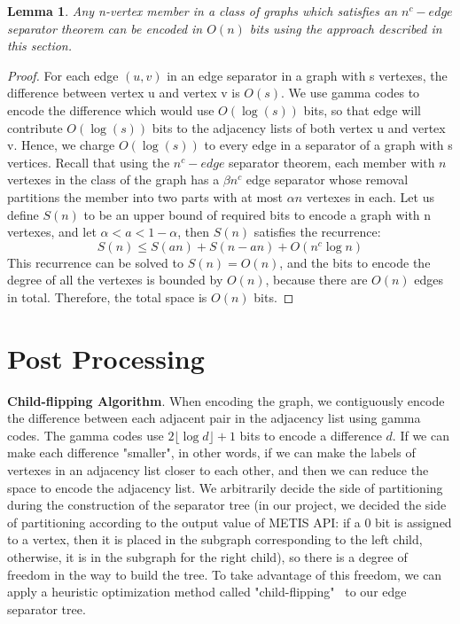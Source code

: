 \documentclass[12pt,glossary]{dalthesis}
\newtheorem{lemma}[theorem]{Lemma}
\begin{document}
\bigskip
\begin{lemma}
Any n-vertex member in a class of graphs which satisfies an $n^{c}-edge$ separator
theorem can be encoded in $O(n)$ bits using the approach described in this section.
\end{lemma}

\bigskip
\begin{proof}
For each edge $(u, v)$ in an edge separator in a graph with s vertexes, the difference
between vertex u and vertex v is $O(s)$. We use gamma codes to encode the difference which would use $O(\log (s))$ bits, so that edge will contribute $O(\log (s))$ bits to the adjacency lists of both vertex u and vertex v. Hence, we charge $O(\log (s))$ to every edge in a separator of a graph with s vertices. Recall that using the $n^{c}- edge$ separator theorem, each member with $n$ vertexes in the class of the graph has a $\beta n^{c}$ edge separator whose removal partitions the member into two parts with at most $\alpha n$ vertexes in each. Let us define $S(n)$ to be an upper bound of required bits to encode a graph with n vertexes, and let $\alpha < a < 1 - \alpha $, then $S(n)$ satisfies the recurrence:
\[ S(n) \leq S(an) + S(n-an) + O(n^{c} \log n) \]
This recurrence can be solved to $S(n) = O(n)$, and the bits to encode the degree of all the vertexes is bounded by $O(n)$, because there are $O(n)$ edges in total. Therefore, the total space is $O(n)$ bits.
\end{proof}

\bigskip
\bigskip

\section{Post Processing}

\textbf{Child-flipping Algorithm}. When encoding the graph, we contiguously encode the difference between each adjacent pair in the adjacency list using gamma codes. The gamma codes use $2\lfloor \log d \rfloor + 1$ bits to encode a difference $d$. If we can make each difference "smaller", in other words, if we can make the labels of vertexes in an adjacency list closer to each other, and then we can reduce the space to encode the adjacency list. We arbitrarily decide the side of partitioning during the construction of the separator tree (in our project, we decided the side of partitioning according to the output value of METIS API: if a 0 bit is assigned to a vertex, then it is placed in the subgraph corresponding to the left child, otherwise, it is in the subgraph for the right child), so there is a degree of freedom in the way to build the tree. To take advantage of this freedom, we can apply a heuristic optimization method called "child-flipping"~\cite{compact-representation} to our edge separator tree.
\end{document}
